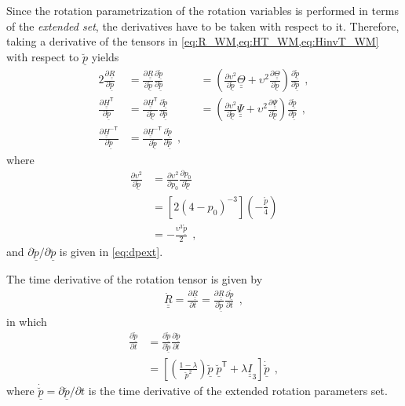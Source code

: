 \documentclass[12pt,a4paper,oneside,english]{abntex2} %
\newcommand{\vect}[1]{\underline{#1}}
\newcommand{\del}[2]{\frac{\partial#1}{\partial#2}}
\def\tens#1{\underline{\underline{#1}}}
\def\lb{\left[}
\def\rb{\right]}
\def\lp{\left(}
\def\rp{\right)}
\def\T{\mathsf{T}}
\def\Ithree{\tens{I}_3}
\def\R{\tens{R}}
\def\Rdot{\dot{\R}}
\def\H{\tens{H}}
\def\HT{\H^\T}
\def\HinvT{\H^{-\T}}
\def\p{\vect{p}}
\def\pscaled{\mathring{\p}}
\def\pext{\breve{\p}}
\def\pextnorm{\breve{p}}
\def\pextdot{\dot{\pext}}
\def\Th{\tens{\Theta}}
\begin{document}
\begin{apendicesenv}
Since the rotation parametrization of the rotation variables is performed in terms of the \textit{extended set}, the derivatives have to be taken with respect to it. Therefore, taking a derivative of the tensors in \cref{eq:R_WM,eq:HT_WM,eq:HinvT_WM} with respect to $\pext$ yields
\begin{alignat}{2}
    \del{\R}{\pext} &= \del{\R}{\pscaled}\del{\pscaled}{\pext} 
    &&= \lp\del{\upsilon^2}{\pscaled}\Th+\upsilon^2\del{\Th}{\pscaled}\rp\del{\pscaled}{\pext} \ \ ,
    \label{eq:dR_dpext}
    \\
    \del{\HT}{\pext} &= \del{\HT}{\pscaled}\del{\pscaled}{\pext} &&= \lp\del{\upsilon^2}{\pscaled}\tens{\Psi}+\upsilon^2\del{\tens{\Psi}}{\pscaled}\rp\del{\pscaled}{\pext} \ \ ,
    \label{eq:dHT_dpext}
    \\
    \del{\HinvT}{\pext} &= \del{\HinvT}{\pscaled}\del{\pscaled}{\pext} \ \ ,
    \label{eq:dHinvT_dpext}
\end{alignat}
where 
\begin{align}
    \del{\upsilon^2}{\pscaled} &= \del{\upsilon^2}{p_0}\del{p_0}{\pscaled} 
    \nonumber \\
    &= \lb2\lp4-p_0\rp^{-3}\rb \lp -\frac{\pscaled}{4} \rp 
    \nonumber \\
    &= -\frac{\upsilon^3\pscaled}{2} \ \ ,
    \label{eq:dups_dpscaled}
\end{align}
and $\partial\pscaled/\partial\pext$ is given in \cref{eq:dpext}.

The time derivative of the rotation tensor is given by
\begin{align}
    \Rdot = \del{\R}{t} = \del{\R}{\pscaled}\del{\pscaled}{t} \ \ ,
    \label{eq:dR_dt}
\end{align}
in which 
\begin{align}
    \del{\pscaled}{t} &= \del{\pscaled}{\pext}\del{\pext}{t}
    \nonumber \\
    &= \lb \lp\frac{1-\lambda}{\pextnorm^2}\rp \pext\;\pext^\T + \lambda\Ithree \rb \pextdot \ \ ,
    \label{eq:dpscl_dt}
\end{align}
where $\pextdot = \partial\pext/\partial t$ is the time derivative of the extended rotation parameters set.


\end{apendicesenv}
\end{document}

